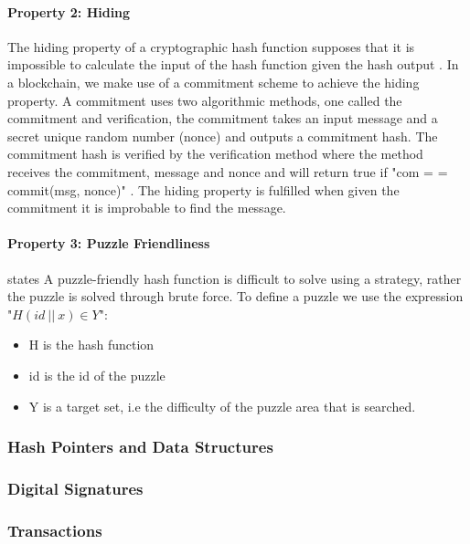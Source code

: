 \paragraph{Property 2: Hiding}

The hiding property of a cryptographic hash function supposes that it is impossible to calculate the input of the hash function given the hash output \autocite{narayananBitcoinCryptocurrencyTechnologies2016}. In a blockchain, we make use of a commitment scheme to achieve the hiding property. A commitment uses two algorithmic methods, one called the commitment and verification, the commitment takes an input message and a secret unique random number (nonce) and outputs a commitment hash. The commitment hash is verified by the verification method where the method receives the commitment, message and nonce and will return true if "com = = commit(msg, nonce)" \autocite{narayananBitcoinCryptocurrencyTechnologies2016}. The hiding property is fulfilled when given the commitment it is improbable to find the message.

\paragraph{Property 3: Puzzle Friendliness}

\autocite{narayananBitcoinCryptocurrencyTechnologies2016} states A puzzle-friendly hash function is difficult to solve using a strategy, rather the puzzle is solved through brute force. To define a puzzle we use the expression "\(H(id \ || \ x) \in Y \)":

\begin{itemize}
    \item H is the hash function
    \item id is the id of the puzzle
    \item Y is a target set, i.e the difficulty of the puzzle area that is searched.
\end{itemize}

\subsubsection{Hash Pointers and Data Structures}

\subsubsection{Digital Signatures}

\subsubsection{Transactions}

